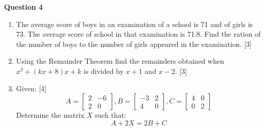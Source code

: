 \noindent
\textbf{Question 4}
\begin{enumerate}[label=(\roman*)]

    \item The average score of boys in an examination of a school is 71 and 
        of girls is 73. The average score of school in that examination is 
        71.8. Find the ration of the number of boys to the number of girls
        appeared in the examination. \hfill [3]

    \item Using the Remainder Theorem find the remainders obtained when 
        $x^3 + (kx+8)x + k$ is divided by $x+1$ and $x-2$. \hfill [3]

    \item Given: \hfill [4]
        \[ 
            A = \begin{bmatrix} 2 & -6 \\ 2 & 0 \end{bmatrix},
            B = \begin{bmatrix} -3 & 2 \\ 4 & 0 \end{bmatrix},
            C = \begin{bmatrix} 4 & 0 \\ 0 & 2 \end{bmatrix}
        \]
        Determine the matrix $X$ such that: \[ A + 2X = 2B + C \]


\end{enumerate}

